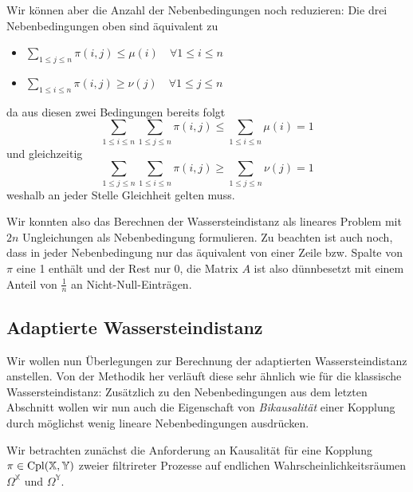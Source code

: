 Wir können aber die Anzahl der Nebenbedingungen noch reduzieren: Die drei Nebenbedingungen oben sind äquivalent zu 
\begin{itemize}
    \item $\sum_{1\leq j \leq n} \pi(i,j) \leq \mu(i) \quad \forall 1\leq i\leq n$
    \item $\sum_{1\leq i \leq n} \pi(i,j) \geq \nu(j) \quad \forall 1\leq j\leq n$
\end{itemize}
da aus diesen zwei Bedingungen bereits folgt 
$$\sum_{1\leq i\leq n} \sum_{1\leq j\leq n} \pi(i,j) \leq \sum_{1\leq i\leq n} \mu(i) = 1$$
und gleichzeitig
$$\sum_{1\leq j\leq n}\sum_{1\leq i\leq n} \pi(i,j) \geq \sum_{1\leq j\leq n}\nu(j)=1$$
weshalb an jeder Stelle Gleichheit gelten muss.

Wir konnten also das Berechnen der Wassersteindistanz als lineares Problem mit $2n$ Ungleichungen als Nebenbedingung formulieren. Zu beachten ist auch noch, dass in jeder Nebenbedingung nur das äquivalent von einer Zeile bzw. Spalte von $\pi$ eine 1 enthält und der Rest nur $0$, die Matrix $A$ ist also dünnbesetzt mit einem Anteil von $\frac{1}{n}$ an Nicht-Null-Einträgen.

\subsection{Adaptierte Wassersteindistanz}
Wir wollen nun Überlegungen zur Berechnung der adaptierten Wassersteindistanz anstellen. Von der Methodik her verläuft diese sehr ähnlich wie für die klassische Wassersteindistanz: Zusätzlich zu den Nebenbedingungen aus dem letzten Abschnitt wollen wir nun auch die Eigenschaft von \emph{Bikausalität} einer Kopplung durch möglichst wenig lineare Nebenbedingungen ausdrücken. 

Wir betrachten zunächst die Anforderung an Kausalität für eine Kopplung $\pi \in \operatorname{Cpl}(\mathbb{X}, \mathbb{Y})$ zweier filtrireter Prozesse auf endlichen Wahrscheinlichkeitsräumen $\Omega^\mathbb{X}$ und $\Omega^\mathbb{Y}$. 

